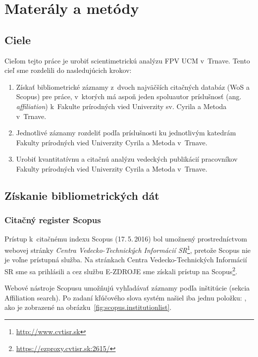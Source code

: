 \chapter{Materály a metódy}

\section{Ciele}

Cieľom tejto práce je urobiť scientimetrickú analýzu FPV UCM v~Trnave.  Tento
cieľ sme rozdelili do nasledujúcich krokov:

\begin{enumerate}
\item Získať bibliometrické záznamy z~dvoch najväčších citačných databáz (WoS a
  Scopus) pre práce, v~ktorých má aspoň jeden spoluautor príslušnosť
  (ang.\,\emph{affiliation}) k~Fakulte prírodných vied Univerzity sv. Cyrila a
  Metoda v~Trnave.
\item Jednotlivé záznamy rozdeliť podľa príslušnosti ku jednotlivým katedrám
  Fakulty prírodných vied Univerzity Cyrila a Metoda v~Trnave.
\item Urobiť kvantitatívnu a citačnú analýzu vedeckých publikácií pracovníkov
  Fakulty prírodných vied Univerzity Cyrila a Metoda v~Trnave.
\end{enumerate}


\section{Získanie bibliometrických dát}

\subsection{Citačný register Scopus}

Prístup k~citačnému indexu Scopus (17.\,5.\,2016) bol umožnený prostredníctvom
webovej stránky \emph{Centra Vedecko-Technických Informácií
  SR}\footnote{\url{http://www.cvtisr.sk}}, pretože Scopus nie je voľne
prístupná služba.  Na stránkach Centra Vedecko-Technických Informácií SR sme sa
prihlásili a cez službu E-ZDROJE sme získali prístup na
Scopus\footnote{\url{https://ezproxy.cvtisr.sk:2615/}}.

Webové nástroje Scopusu umožňujú vyhľadávať záznamy podľa inštitúcie (sekcia
Affiliation search).  Po zadaní kľúčového slova  systém našiel iba
jednu položku: , ako je
zobrazené na obrázku~\ref{fig:scopus.institutionlist}.

